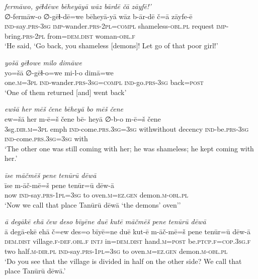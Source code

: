 \ea \label{ZP.70}
\textit{fermāwo, gēɫdēwe bēheyāyā wāz bārdē čā zāyfē!’} \\ 
\gll ∅-fermāw-o ∅-gēɫ-dē=we bēheyā-yā wāz b-ār-dē č=ā zāyfe-ē \\ 
 \textsc{ind-}say\textsc{.prs}\textsc{-3sg} \textsc{imp-}wander\textsc{.prs}-\textsc{2pl}\textsc{=compl} shameless\textsc{-obl}\textsc{.pl} request \textsc{imp-}bring\textsc{.prs}-\textsc{2pl} from=\textsc{dem.dist} woman\textsc{-obl}\textsc{.f} \\ 
\glt `He said, ‘Go back, you shameless [demons]! Let go of that poor girl!'
\z 
 
\ea \label{ZP.71}
\textit{yošā gēɫowe milo dimāwe} \\ 
\gll yo=šā ∅-gēɫ-o=we mi-l-o dimā=we \\ 
 one\textsc{.m}\textsc{=3pl} \textsc{ind-}wander\textsc{.prs}\textsc{-3sg}\textsc{=compl} \textsc{ind-}go\textsc{.prs}\textsc{-3sg} back\textsc{=\textsc{post}} \\ 
\glt `One of them returned [and] went back'
\z 
 
\ea \label{ZP.72}
\textit{ewšā her mēš čene bēheyā bo mēš čene} \\ 
\gll ew=šā her m-ē=š čene bē- heyā ∅-b-o m-ē=š čene \\ 
 3sg\textsc{.dir}\textsc{.m}\textsc{=3pl} emph \textsc{ind-}come\textsc{.prs}\textsc{.3sg}\textsc{=3sg} withwithout decency \textsc{ind-}be\textsc{.prs}\textsc{-3sg} \textsc{ind-}come\textsc{.prs}\textsc{.3sg}\textsc{=3sg} with \\ 
\glt `The other one was still coming with her; he was shameless; he kept coming with her.'
\z 
 
\ea \label{ZP.73}
\textit{īse māčmēš pene tenūrū dēwā} \\ 
\gll īse m-āč-mē=š pene tenūr=ū dēw-ā \\ 
 now \textsc{ind-}say\textsc{.prs}\textsc{-1pl}\textsc{=3sg} to oven\textsc{.m}\textsc{\textsc{=ez.gen}} demon\textsc{.m}\textsc{-obl}\textsc{.pl} \\ 
\glt `Now we call that place Tanūrū dēwā ‘the demons’ oven’'
\z 
 
\ea \label{ZP.74}
\textit{ā degākē ehā čew deso bīyēne duē kutē māčmēš pene tenūrū dēwā} \\ 
\gll ā degā-ekē ehā č=ew des=o bīyē=ne duē kut-ē m-āč-mē=š pene tenūr=ū dēw-ā \\ 
 \textsc{dem.dist} village\textsc{.f}\textsc{-def}\textsc{.obl}\textsc{.f} \textsc{intj} in=\textsc{dem.dist} hand\textsc{.m}\textsc{=\textsc{post}} be\textsc{.ptcp}\textsc{.f}\textsc{=cop}\textsc{.3sg}\textsc{.f} two half\textsc{.m}\textsc{-dir}\textsc{.pl} \textsc{ind-}say\textsc{.prs}\textsc{-1pl}\textsc{=3sg} to oven\textsc{.m}\textsc{\textsc{=ez.gen}} demon\textsc{.m}\textsc{-obl}\textsc{.pl} \\ 
\glt `Do you see that the village is divided in half on the other side? We call that place Tanūrū dēwā.'
\z 
 

